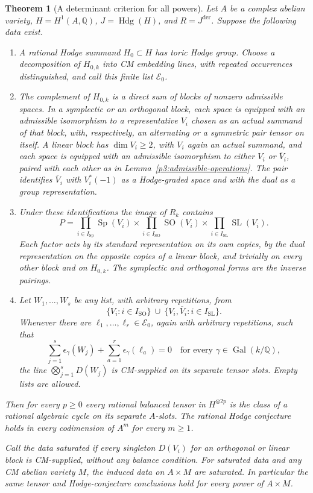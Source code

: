 \documentclass[11pt]{article}
\newcommand{\Q}{\mathbb Q}
\newtheorem{theorem}{Theorem}[section]
\numberwithin{equation}{section}
\begin{document}
\begin{theorem}[A determinant criterion for all powers]
\label{p3:tensor-criterion}
Let $A$ be a complex abelian variety, $H=H^1(A,\Q)$,
$J=\operatorname{Hdg}(H)$, and $R=J^{\mathrm{der}}$.
Suppose the following data exist.

\begin{enumerate}[label=\textnormal{(\alph*)}]
\item A rational Hodge summand $H_0\subset H$ has toric Hodge group.
Choose a decomposition of $H_{0,k}$ into CM embedding lines,
with repeated occurrences distinguished, and call this finite list
$\mathcal E_0$.
\item The complement of $H_{0,k}$ is a direct sum of blocks of
nonzero admissible spaces.  In a symplectic or an orthogonal block,
each space is equipped with an admissible isomorphism to a
representative $V_i$ chosen as an actual summand of that block,
with, respectively, an alternating or a
symmetric pair tensor on itself.  A linear block has
$\dim V_i\ge2$, with $V_i$ again an actual summand, and each space is equipped with an admissible
isomorphism to either $V_i$ or $\overline V_i$, paired with
each other as in Lemma~\ref{p3:admissible-operations}.
The pair identifies $\overline V_i$ with $V_i^*(-1)$ as a
Hodge-graded space and with the dual as a group representation.
\item Under these identifications the image of $R_k$ contains
\[
 P=\prod_{i\in I_{\mathrm{Sp}}}\operatorname{Sp}(V_i)
   \times\prod_{i\in I_{\mathrm{SO}}}\operatorname{SO}(V_i)
   \times\prod_{i\in I_{\mathrm{SL}}}\operatorname{SL}(V_i).
\]
Each factor acts by its standard representation on its own copies,
by the dual representation on the opposite copies of a linear
block, and trivially on every other block and on $H_{0,k}$.
The symplectic and orthogonal forms are the inverse pairings.
\item Let $W_1,\ldots,W_s$ be any list, with arbitrary repetitions,
from
\[
 \{V_i:i\in I_{\mathrm{SO}}\}
 \ \cup\
 \{V_i,\overline V_i:i\in I_{\mathrm{SL}}\}.
\]
Whenever there are $\ell_1,\ldots,\ell_r\in\mathcal E_0$, again
with arbitrary repetitions, such that
\begin{equation}
 \label{p3:eq:determinant-balance}
 \sum_{j=1}^s\epsilon_\gamma(W_j)
 +\sum_{a=1}^r\epsilon_\gamma(\ell_a)=0
 \quad\text{for every }\gamma\in\operatorname{Gal}(k/\Q),
\end{equation}
the line $\bigotimes_{j=1}^sD(W_j)$ is CM-supplied on its
separate tensor slots.  Empty lists are allowed.
\end{enumerate}

Then for every $p\ge0$ every rational balanced tensor in $H^{\otimes 2p}$ is the
class of a rational algebraic cycle on its separate $A$-slots.
The rational Hodge conjecture holds in every codimension of $A^m$
for every $m\ge1$.

Call the data \emph{saturated} if every singleton $D(V_i)$ for
an orthogonal or linear block is CM-supplied, without any balance
condition.  For saturated data and any CM abelian variety $M$,
the induced data on $A\times M$ are saturated.  In particular the
same tensor and Hodge-conjecture conclusions hold for every power of
$A\times M$.
\end{theorem}
\end{document}
